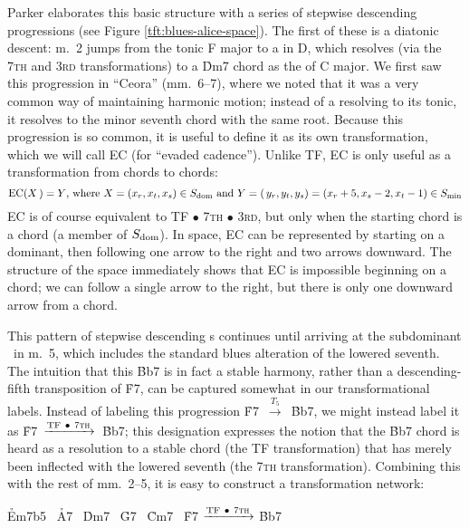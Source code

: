 Parker elaborates this basic structure with a series of stepwise descending
\tf progressions (see Figure \ref{tft:blues-alice-space}). The first of
these is a diatonic descent: m.~2 jumps from the tonic F  major to a \tf in D,
which resolves (via the \textsc{7th} and \textsc{3rd} transformations) to a
\h{Dm7} chord as the \ii of C major. We first saw this progression in
``Ceora'' (mm.~6--7), where we noted that it was a very common way of
maintaining harmonic motion; instead of a \tf resolving to its tonic, it resolves
to the minor seventh chord with the same root. Because this progression is so
common, it is useful to define it as its own transformation, which we will
call EC (for ``evaded cadence''). Unlike TF, EC is only useful as a
transformation from \V chords to \ii chords:
%
{\novspace%
\begin{displaymath}
  \mathrm{EC}(X\,) = Y\text{, where}\ X = (x_r, x_t, x_s) \in S_{\mathrm{dom}}
   \text{ and}\
  Y = (\,y_r, y_t, y_s) = (x_r + 5, x_s - 2, x_t - 1) \in S_{\mathrm{min}}
\end{displaymath}}%
%
EC is of course equivalent to TF $\bullet$ \textsc{7th} $\bullet$ \textsc{3rd},
but only when the starting chord is a \V chord (a member of $S_{\mathrm{dom}}$).
In \tf space, EC can be represented by starting on a dominant, then following
one arrow to the right and two arrows downward. The structure of the space
immediately shows that EC is impossible beginning on a \ii chord; we
can follow a single arrow to the right, but there is only one downward arrow
from a \V chord.\fn{tft-7}

This pattern of stepwise descending \tf{}s continues until arriving at the
subdominant \Bflat\ in m.~5, which includes the standard blues alteration of
the lowered seventh.\fn{tft-6} The intuition that this \h{Bb7} is in fact a
stable harmony, rather than a descending-fifth transposition of \h{F7}, can be
captured somewhat in our transformational labels. Instead of labeling this progression
\mbox{\h{F7} $\xrightarrow{T_5}$ \h{Bb7}}, we might instead label it as
\mbox{\h{F7} $\xrightarrow{\mathrm{TF}\ \bullet\ \text{\textsc{7th}}}$ \h{Bb7}};
this designation expresses the notion that the \h{Bb7} chord is heard as a
resolution to a stable chord (the TF transformation) that has merely been
inflected with the lowered seventh (the \textsc{7th} transformation).
Combining this with the rest of mm.~2--5, it is easy to construct a
transformation network:

\begin{center}
  \h{Em7b5} \TFarrow\ \h{A7} \ECarrow\
  \h{Dm7}   \TFarrow\ \h{G7} \ECarrow\
  \h{Cm7}   \TFarrow\ \h{F7} $\xrightarrow{\mathrm{TF}\ \bullet\ \text{\textsc{7th}}}$
  \h{Bb7}
\end{center}

